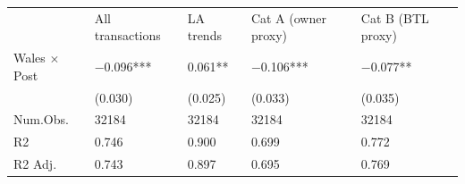 \begin{tabular}{lllll}
& All transactions & LA trends & Cat A (owner proxy) & Cat B (BTL proxy) \\
Wales $\times$ Post & \num{-0.096}*** & \num{0.061}** & \num{-0.106}*** & \num{-0.077}** \\
& (\num{0.030}) & (\num{0.025}) & (\num{0.033}) & (\num{0.035}) \\
Num.Obs. & \num{32184} & \num{32184} & \num{32184} & \num{32184} \\
R2 & \num{0.746} & \num{0.900} & \num{0.699} & \num{0.772} \\
R2 Adj. & \num{0.743} & \num{0.897} & \num{0.695} & \num{0.769} \\
\end{tabular}
